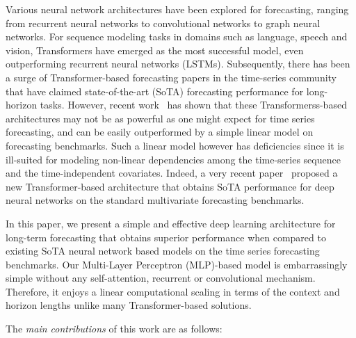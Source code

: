 \documentclass[10pt]{article} \usepackage[accepted]{tmlr}
\theoremstyle{plain}
\theoremstyle{definition}
\theoremstyle{remark}
\begin{document}
Various neural network architectures have been explored for forecasting, ranging from recurrent neural networks to convolutional networks to graph neural networks.
For sequence modeling tasks in domains such as language, speech and vision, Transformers \citep{vaswani2017attention} have emerged as the most successful model, even outperforming recurrent neural networks (LSTMs)\citep{hochreiter1997long}.
Subsequently, there has been a surge of Transformer-based forecasting papers \citep{wu2021autoformer,zhou2021informer,zhou2022fedformer} in the time-series community that have claimed state-of-the-art (SoTA) forecasting performance for long-horizon tasks. However, recent work~\citep{zeng2022transformers} has shown that these Transformerss-based architectures may not be as powerful as one might expect for time series forecasting, and can  be easily outperformed  by a simple linear model on forecasting benchmarks. Such a linear model however has deficiencies since it is ill-suited for modeling non-linear dependencies among the time-series sequence and the time-independent covariates. Indeed, a very recent paper~\citep{nie2022time} proposed a new Transformer-based architecture that  obtains SoTA performance for deep neural networks on the standard multivariate forecasting benchmarks.



In this paper, we present a simple and effective deep learning architecture for long-term forecasting that obtains  superior performance when compared to existing SoTA neural network based models on the   time series forecasting benchmarks. Our Multi-Layer Perceptron (MLP)-based model is embarrassingly  simple without any self-attention, recurrent or convolutional mechanism. Therefore, it enjoys a linear computational scaling in terms of the context and horizon lengths unlike many Transformer-based solutions.


The \textit{main contributions} of this work are as follows:
\end{document}

